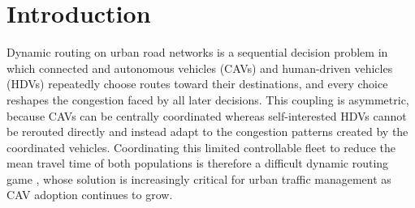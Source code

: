 \section{Introduction}













Dynamic routing on urban road networks is a sequential decision problem in which connected and autonomous vehicles (CAVs) and human-driven vehicles (HDVs) repeatedly choose routes toward their destinations, and every choice reshapes the congestion faced by all later decisions. This coupling is asymmetric, because CAVs can be centrally coordinated whereas self-interested HDVs cannot be rerouted directly and instead adapt to the congestion patterns created by the coordinated vehicles. Coordinating this limited controllable fleet to reduce the mean travel time of both populations is therefore a difficult dynamic routing game \cite{calderone2017markov,lazar2020routing}, whose solution is increasingly critical for urban traffic management as CAV adoption continues to grow.

